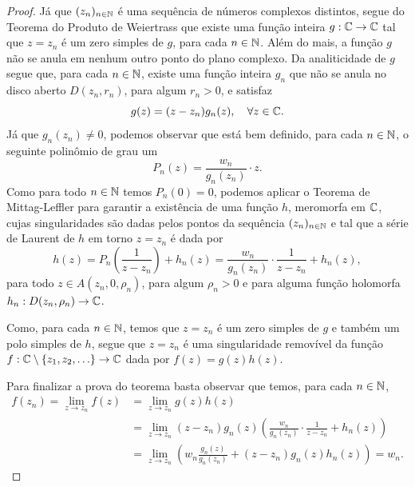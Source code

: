     
    \begin{proof}
    Já que $(z_n)_{n\in\mathbb{N}}$ é uma sequência de números
    complexos distintos, segue do Teorema do Produto de 
    Weiertrass que existe uma função inteira $g:\mathbb{C}\to\mathbb{C}$
    tal que $z=z_n$ é um zero simples de $g$, para cada $n\in\mathbb{N}$. 
    Além do mais, a função $g$ não se anula em nenhum
    outro ponto do plano complexo. 
    Da analiticidade de $g$ segue que, para cada $n\in\mathbb{N}$, existe uma função 
    inteira $g_n$ que não se anula no 
    disco aberto $D(z_n,r_n)$, para algum $r_n>0$,
    e satisfaz 
    \[
    g(z) = (z-z_n)g_n(z), \quad\forall z\in\mathbb{C}.
    \]
    Já que $g_n(z_n)\neq 0$, podemos observar que está bem definido, 
    para cada $n\in\mathbb{N}$, o seguinte polinômio de grau um  
    \[
    P_n(z) = \frac{w_n}{g_n(z_n)}\cdot z.
    \]
    Como para todo $n\in\mathbb{N}$ temos $P_n(0)=0$, 
    podemos aplicar o 
    Teorema de Mittag-Leffler para garantir a existência 
    de uma função $h$, meromorfa em $\mathbb{C}$,
    cujas singularidades são dadas pelos pontos da
    sequência $(z_n)_{n\in\mathbb{N}}$ e tal que a série de Laurent 
    de $h$ em torno $z=z_n$ é dada por 
    \[
    h(z) 
    = 
    P_n\left( \frac{1}{z-z_n}\right)+h_n(z)
    =
    \frac{w_n}{g_n(z_n)}\cdot \frac{1}{z-z_n} +h_n(z),
    \]
    para todo $z\in A(z_n,0,\rho_n)$, para algum $\rho_n>0$
    e para alguma função holomorfa $h_n:D(z_n,\rho_n)\to\mathbb{C}$.
    
    Como, para cada $n\in\mathbb{N}$, temos que $z=z_n$ é um zero 
    simples de $g$ e também um polo simples de $h$, segue que
    $z=z_n$ é uma singularidade removível da função 
    $f:\mathbb{C}\setminus\{z_1,z_2,\ldots\}\to\mathbb{C}$ dada por
    $f(z)=g(z)h(z)$. 
    
    Para finalizar a prova do teorema basta observar
    que temos, para cada $n\in\mathbb{N}$,
    \begin{align*}
    f(z_n)
    =
    \lim_{z\to z_n}f(z)
    &=
    \lim_{z\to z_n}
    g(z)h(z)
    \\
    &=
    \lim_{z\to z_n}
    (z-z_n)g_n(z)
    \left( \frac{w_n}{g_n(z_n)} \cdot\frac{1}{z-z_n}+h_n(z) \right)
    \\
    &=
    \lim_{z\to z_n}
    \left( 
    w_n\frac{g_n(z)}{g_n(z_n)}
    +
    (z-z_n)g_n(z)h_n(z) 
    \right)
    =
    w_n.
    \end{align*}
    \end{proof}
    
